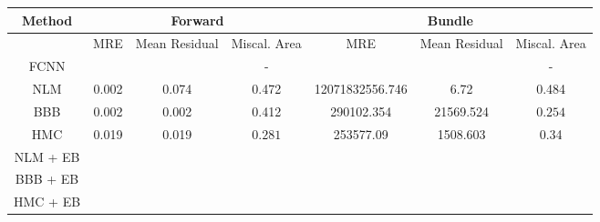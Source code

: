 \documentclass[convert={outext=.png}]{standalone}
\begin{document}

\begin{tabular}{c c c c c c c}
\hline
\hline
Method &  \multicolumn{3}{c}{Forward} & \multicolumn{3}{c}{Bundle} \\ \hline
 & MRE & Mean Residual & Miscal. Area & MRE & Mean Residual & Miscal. Area\\
 FCNN &  &  & - &  &  & - \\
 \hline
 NLM & 0.002 & 0.074 & 0.472 & 12071832556.746 & 6.72 & 0.484 \\
 BBB & 0.002 & 0.002 & 0.412 & 290102.354 & 21569.524 & $\mathbf{0.254}$ \\
 HMC & 0.019 & 0.019 & $\mathbf{0.281}$ & 253577.09 & 1508.603 & 0.34 \\
 \hline
 NLM + EB &  &  &  &  &  &  \\
 BBB + EB &  &  &  &  &  &  \\
 HMC + EB &  &  &  &  &  &  \\
\hline
\hline
\end{tabular}
\end{document}
